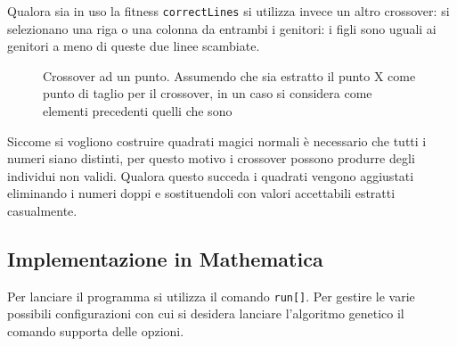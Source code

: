 \documentclass[italian,twoside,twocolumn]{article}
\begin{document}
Qualora sia in uso la fitness \texttt{correctLines} si utilizza invece un altro crossover: si selezionano una riga o una colonna da entrambi i genitori: i figli sono uguali ai genitori a meno di queste due linee scambiate. 

\begin{figure}[!htbp]
	\centering
	\caption{Crossover ad un punto. Assumendo che sia estratto il punto X come punto di taglio per il crossover, in un caso si considera come elementi precedenti quelli che sono}
	\label{fig:crosso}
\end{figure}

\noindent
Siccome si vogliono costruire quadrati magici normali è necessario che tutti i numeri siano distinti, per questo motivo i crossover possono produrre degli individui non validi. Qualora questo succeda i quadrati vengono aggiustati eliminando i numeri doppi e sostituendoli con valori accettabili estratti casualmente.


\subsection{Implementazione in Mathematica}


Per lanciare il programma si utilizza il comando \texttt{run[]}. Per gestire le varie possibili configurazioni con cui si desidera lanciare l'algoritmo genetico il comando supporta delle opzioni.
\end{document}
